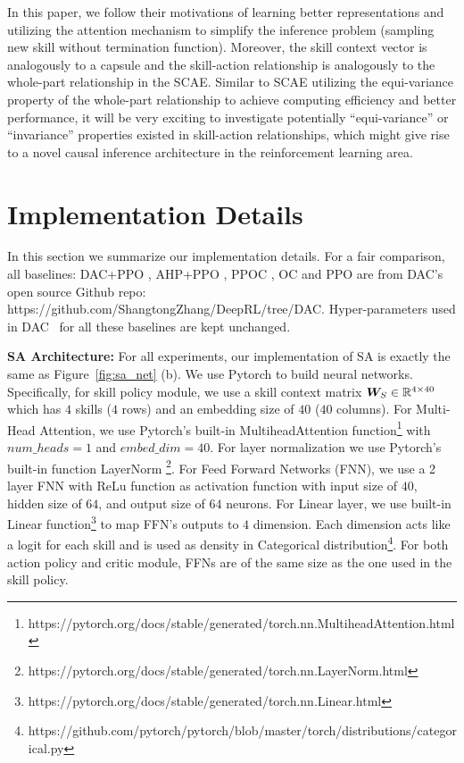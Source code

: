 In this paper, we follow their motivations of learning better
representations and utilizing the attention mechanism to simplify
the inference problem (sampling new skill without termination
function). Moreover, the skill context vector is analogously to a
capsule and the skill-action relationship is analogously to the
whole-part relationship in the SCAE. Similar to SCAE utilizing
the equi-variance property of the whole-part relationship to
achieve computing efficiency and better performance, it will be
very exciting to investigate potentially ``equi-variance'' or
``invariance'' properties existed in skill-action relationships,
which might give rise to a novel causal inference architecture in
the reinforcement learning area.
\section{Implementation Details}
\label{sec:append_implement}

In this section we summarize our implementation details. For a
fair comparison, all baselines: DAC+PPO \cite{zhang2019dac},
AHP+PPO \cite{levy2011unified}, PPOC
\cite{klissarov2017learnings}, OC \cite{bacon2017option} and PPO
\cite{schulman2017proximal} are from DAC's open source Github
repo: https://github.com/ShangtongZhang/DeepRL/tree/DAC.
Hyper-parameters used in DAC~\cite{zhang2019dac} for all these
baselines are kept unchanged.

\textbf{SA Architecture:} For all experiments, our implementation
of SA is exactly the same as Figure~\ref{fig:sa_net} (b). We use
Pytorch to build neural networks. Specifically, for skill policy
module, we use a skill context matrix ${\bm{W}}_S\in {\mathbb{R}}^{4\times 40}$
which has $4$ skills ($4$ rows) and an embedding size of $40$
($40$ columns). For Multi-Head Attention, we use Pytorch's
built-in MultiheadAttention
function\footnote{https://pytorch.org/docs/stable/generated/torch.nn.MultiheadAttention.html}
with $num\_heads=1$ and $embed\_dim=40$. For layer normalization
we use Pytorch's built-in function LayerNorm
\footnote{https://pytorch.org/docs/stable/generated/torch.nn.LayerNorm.html}.
For Feed Forward Networks (FNN), we use a 2 layer FNN with ReLu
function as activation function with input size of $40$, hidden
size of $64$, and output size of $64$ neurons. For Linear layer,
we use built-in Linear
function\footnote{https://pytorch.org/docs/stable/generated/torch.nn.Linear.html}
to map FFN's outputs to $4$ dimension. Each dimension acts like a
logit for each skill and is used as density in Categorical
distribution\footnote{https://github.com/pytorch/pytorch/blob/master/torch/distributions/categorical.py}.
For both action policy and critic module, FFNs are of the same
size as the one used in the skill policy.

